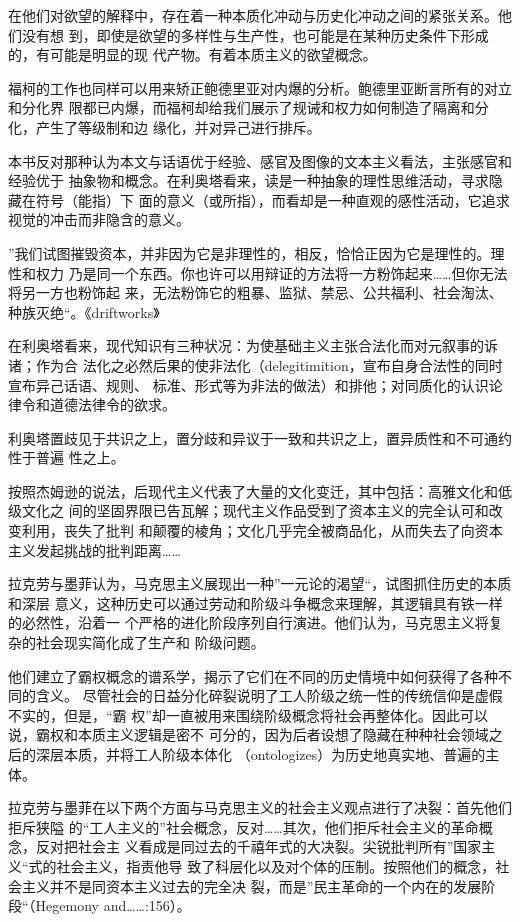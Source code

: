 在他们对欲望的解释中，存在着一种本质化冲动与历史化冲动之间的紧张关系。他们没有想
到，即使是欲望的多样性与生产性，也可能是在某种历史条件下形成的，有可能是明显的现
代产物。有着本质主义的欲望概念。

福柯的工作也同样可以用来矫正鲍德里亚对内爆的分析。鲍德里亚断言所有的对立和分化界
限都已内爆，而福柯却给我们展示了规诫和权力如何制造了隔离和分化，产生了等级制和边
缘化，并对异己进行排斥。



本书反对那种认为本文与话语优于经验、感官及图像的文本主义看法，主张感官和经验优于
抽象物和概念。在利奥塔看来，读是一种抽象的理性思维活动，寻求隐藏在符号（能指）下
面的意义（或所指），而看却是一种直观的感性活动，它追求视觉的冲击而非隐含的意义。

”我们试图摧毁资本，并非因为它是非理性的，相反，恰恰正因为它是理性的。理性和权力
乃是同一个东西。你也许可以用辩证的方法将一方粉饰起来……但你无法将另一方也粉饰起
来，无法粉饰它的粗暴、监狱、禁忌、公共福利、社会淘汰、种族灭绝“。《driftworks》

在利奥塔看来，现代知识有三种状况：为使基础主义主张合法化而对元叙事的诉诸；作为合
法化之必然后果的使非法化（delegitimition，宣布自身合法性的同时宣布异己话语、规则、
标准、形式等为非法的做法）和排他；对同质化的认识论律令和道德法律令的欲求。

利奥塔置歧见于共识之上，置分歧和异议于一致和共识之上，置异质性和不可通约性于普遍
性之上。

按照杰姆逊的说法，后现代主义代表了大量的文化变迁，其中包括：高雅文化和低级文化之
间的坚固界限已告瓦解；现代主义作品受到了资本主义的完全认可和改变利用，丧失了批判
和颠覆的棱角；文化几乎完全被商品化，从而失去了向资本主义发起挑战的批判距离……

拉克劳与墨菲认为，马克思主义展现出一种”一元论的渴望“，试图抓住历史的本质和深层
意义，这种历史可以通过劳动和阶级斗争概念来理解，其逻辑具有铁一样的必然性，沿着一
个严格的进化阶段序列自行演进。他们认为，马克思主义将复杂的社会现实简化成了生产和
阶级问题。

他们建立了霸权概念的谱系学，揭示了它们在不同的历史情境中如何获得了各种不同的含义。
尽管社会的日益分化碎裂说明了工人阶级之统一性的传统信仰是虚假不实的，但是，“霸
权”却一直被用来围绕阶级概念将社会再整体化。因此可以说，霸权和本质主义逻辑是密不
可分的，因为后者设想了隐藏在种种社会领域之后的深层本质，并将工人阶级本体化
（ontologizes）为历史地真实地、普遍的主体。

拉克劳与墨菲在以下两个方面与马克思主义的社会主义观点进行了决裂：首先他们拒斥狭隘
的“工人主义的”社会概念，反对……其次，他们拒斥社会主义的革命概念，反对把社会主
义看成是同过去的千禧年式的大决裂。尖锐批判所有”国家主义“式的社会主义，指责他导
致了科层化以及对个体的压制。按照他们的概念，社会主义并不是同资本主义过去的完全决
裂，而是”民主革命的一个内在的发展阶段“（Hegemony and……:156）。


